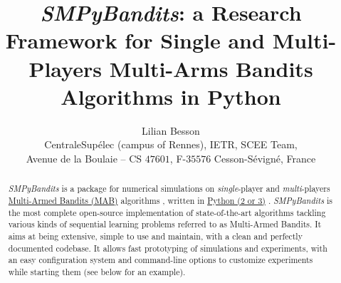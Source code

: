 \documentclass[a4paper,10pt,]{article}
\begin{document}
\title{\emph{SMPyBandits}: a Research Framework for Single and Multi-Players Multi-Arms Bandits Algorithms in Python}


\author{\name Lilian Besson  \\
        \addr CentraleSup\'elec (campus of Rennes), IETR, SCEE Team,\\
        Avenue de la Boulaie -- CS $47601$, F-$35576$ Cesson-S\'evign\'e, France
}



\maketitle

\vspace*{15pt}

\begin{abstract}%
  \emph{SMPyBandits} is a package for numerical simulations on
  \emph{single}-player and \emph{multi}-players
  \href{https://en.wikipedia.org/wiki/Multi-armed_bandit}{Multi-Armed
  Bandits (MAB)} algorithms \citep{Bubeck12}, written in
  \href{https://www.python.org/}{Python (2 or 3)} \citep{python}.
  \emph{SMPyBandits} is the most complete open-source implementation of
  state-of-the-art algorithms tackling various kinds of sequential
  learning problems referred to as Multi-Armed Bandits. It aims at being
  extensive, simple to use and maintain, with a clean and perfectly
  documented codebase. It allows fast prototyping of simulations and
  experiments, with an easy configuration system and command-line options
  to customize experiments while starting them (see below for an example).
\end{abstract}
\end{document}
